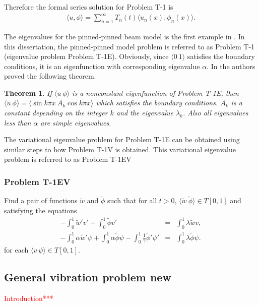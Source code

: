 \documentclass[../../main.tex]{subfiles}
\begin{document}
Therefore the formal series solution for Problem T-1 is
\begin{eqnarray*}
	\langle u, \phi \rangle = \sum_{n=1}^{\infty} T_n(t)\langle u_n(x), \phi_n(x)\rangle.
\end{eqnarray*}

The eigenvalues for the pinned-pinned beam model is the first example in \cite{VV06}. In this dissertation, the pinned-pinned model problem is referred to as Problem T-1 (eigenvalue problem Problem T-1E). Obviously, since $\langle 0 \ 1\rangle$ satisfies the boundary conditions, it is an eigenfunction with corresponding eigenvalue $\alpha$. In \cite{VV06} the authors proved the following theorem.


\newtheorem{ThmVV06}{Theorem}
\begin{ThmVV06}
	If $\langle u \ \phi\rangle$ is a nonconstant eigenfunction of Problem T-1E, then $\langle u \ \phi\rangle = \langle\sin k \pi x \ A_k \cos k \pi x\rangle$ which satisfies the boundary conditions. $A_k$ is a constant depending on the integer $k$ and the eigenvalue $\lambda_k$. Also all eigenvalues less than $\alpha$ are simple eigenvalues.
\end{ThmVV06}

The variational eigenvalue problem for Problem T-1E can be obtained using similar steps to how Problem T-1V is obtained. This variational eigenvalue problem is referred to as Problem T-1EV

\subsubsection*{Problem T-1EV}\label{sssec:1D_Model:ProblemT1EV}
Find a pair of functions $\tilde{w}$ and $\tilde{\phi}$ such that for all $t >0$, $\langle \tilde{w}\ \tilde{\phi}\rangle \in  T[0,1]$ and satisfying the equations
\begin{eqnarray*}
	 -\int_0^1 \tilde{w}'v'  + \int_0^1 \tilde{\phi} v' &=& \int_0^1 \lambda \tilde{w} v ,\\
	 -\int_0^1\alpha \tilde{w}' \psi + \int_0^1\alpha \tilde{\phi} \psi - \int_0^1\frac{1}{\gamma}\tilde{\phi}' \psi' &=& \int_0^1 \lambda \tilde{\phi} \psi .
\end{eqnarray*} for each $\langle v \ \psi\rangle \in T[0,1]$.

\subsection{General vibration problem new}
\textcolor{red}{Introduction***}
\end{document}
